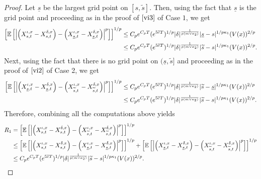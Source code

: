 \documentclass[11pt]{article}
\theoremstyle{theorem}
\theoremstyle{definition}
\newcommand{\1}{{\bf 1}}
\begin{document}
\begin{proof}
Let $\underline{s}$ be the largest grid point on $[s,\widetilde{s}].$ 
Then, using the fact that $\underline{s}$  is the grid point and proceeding as in the proof of $\eqref{vi3}$ of Case $1$, we get
 \begin{align*}  \left[\mathbb{E}\left[\left|\left(X^{\iota, x}_{s,t}-X^{\delta,x}_{s,t}\right) - \left(X^{\iota, x}_{\underline{s},t}-X^{\delta, x}_{\underline{s},t}\right)\right|^p\right]\right]^{1/p} &\leq C_p e^{C_p T} (e^{5\overline{c}T})^{1/p} |\delta|^{\frac{1}{p(m \vee \kappa_2)}}  |\underline{s}-s|^{1/p\kappa_1}(V(x))^{2/p}\notag\\
 &\leq C_p e^{C_p T} (e^{5\overline{c}T})^{1/p} |\delta|^{\frac{1}{p(m \vee \kappa_2)}}  |\widetilde{s} - s|^{1/p\kappa_1}(V(x))^{2/p}.
\end{align*}
Next, using the fact that there is no grid point on  $(\underline{s}, \widetilde{s}]$ and proceeding as in the proof of $\eqref{vi2}$ of Case 2, we get
\begin{align*}
\left[\mathbb{E}\left[\left|\left(X^{\iota, x}_{\underline{s},t}-X^{\delta,x}_{\underline{s},t}\right) - \left(X^{\iota, x}_{\widetilde{s},t}-X^{\delta, x}_{\widetilde{s},t}\right)\right|^p\right]\right]^{1/p} & \leq  C_p e^{C_p T}(e^{5\overline{c}T})^{1/p} |\delta|^{\frac{1}{p(m \vee \kappa_2)}}  |\widetilde{s} -\underline{s}|^{1/p\kappa_1}  (V(x))^{2/p}\notag\\
& \leq  C_p e^{C_p T}(e^{5\overline{c}T})^{1/p} |\delta|^{\frac{1}{p(m \vee \kappa_2)}}  |\widetilde{s} -s|^{1/p\kappa_1}  (V(x))^{2/p}.
\end{align*}
Therefore, combining all the computations above yields
\begin{align*}
R_1&=\left[\mathbb{E}\left[\left|\left(X^{\iota, x}_{s,t}-X^{\delta,x}_{s,t}\right) - \left(X^{\iota, x}_{\widetilde{s},t}-X^{\delta, x}_{\widetilde{s},t}\right)\right|^p\right]\right]^{1/p} \notag\\ 
 & \leq \left[\mathbb{E}\left[\left|\left(X^{\iota, x}_{s,t}-X^{\delta,x}_{s,t}\right) - \left(X^{\iota, x}_{\underline{s},t}-X^{\delta, x}_{\underline{s},t}\right)\right|^p\right]\right]^{1/p} + \left[\mathbb{E}\left[\left|\left(X^{\iota, x}_{\underline{s},t}-X^{\delta,x}_{\underline{s},t}\right) - \left(X^{\iota, x}_{\widetilde{s},t}-X^{\delta, x}_{\widetilde{s},t}\right)\right|^p\right]\right]^{1/p} \notag\\ 
& \leq C_p e^{C_p T}  (e^{5\overline{c}T})^{1/p} |\delta|^{\frac{1}{p(m \vee \kappa_2)}} |\widetilde{s}-s|^{1/p\kappa_1}  (V(x))^{2/p}  . 
\end{align*}

\end{proof}
\end{document}
